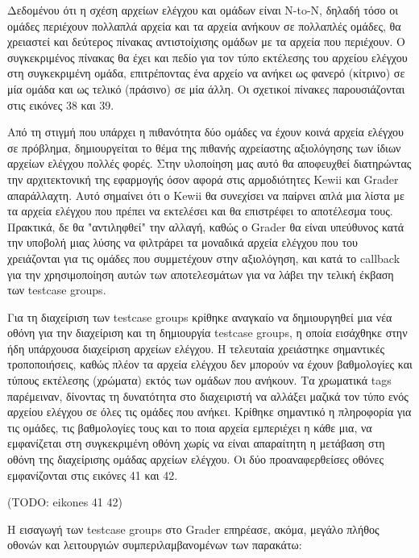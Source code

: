 \documentclass[diploma]{softlab-thesis}
\begin{document}
\bigskip

Δεδομένου ότι η σχέση αρχείων ελέγχου και ομάδων είναι N-to-N, δηλαδή τόσο οι
ομάδες περιέχουν πολλαπλά αρχεία και τα αρχεία ανήκουν σε πολλαπλές ομάδες, θα
χρειαστεί και δεύτερος πίνακας αντιστοίχισης ομάδων με τα αρχεία που περιέχουν.
Ο συγκεκριμένος πίνακας θα έχει και πεδίο για τον τύπο εκτέλεσης του αρχείου
ελέγχου στη συγκεκριμένη ομάδα, επιτρέποντας ένα αρχείο να ανήκει ως φανερό
(κίτρινο) σε μία ομάδα και ως τελικό (πράσινο) σε μία άλλη. Οι σχετικοί πίνακες
παρουσιάζονται στις εικόνες 38 και 39.

\bigskip

Από τη στιγμή που υπάρχει η πιθανότητα δύο ομάδες να έχουν κοινά αρχεία ελέγχου
σε πρόβλημα, δημιουργείται το θέμα της πιθανής αχρείαστης αξιολόγησης των ίδιων
αρχείων ελέγχου πολλές φορές. Στην υλοποίηση μας αυτό θα αποφευχθεί διατηρώντας
την αρχιτεκτονική της εφαρμογής όσον αφορά στις αρμοδιότητες Kewii και Grader
απαράλλαχτη. Αυτό σημαίνει ότι ο Kewii θα συνεχίσει να παίρνει απλά μια λίστα
με τα αρχεία ελέγχου που πρέπει να εκτελέσει και θα επιστρέφει το αποτέλεσμα
τους. Πρακτικά, δε θα "αντιληφθεί" την αλλαγή, καθώς ο Grader θα είναι
υπεύθυνος κατά την υποβολή μιας λύσης να φιλτράρει τα μοναδικά αρχεία ελέγχου
που του χρειάζονται για τις ομάδες που συμμετέχουν στην αξιολόγηση, και κατά το
callback για την χρησιμοποίηση αυτών των αποτελεσμάτων για να λάβει την τελική
έκβαση των testcase groups.

\bigskip

Για τη διαχείριση των testcase groups κρίθηκε αναγκαίο να δημιουργηθεί μια νέα
οθόνη για την διαχείριση και τη δημιουργία testcase groups, η οποία εισάχθηκε
στην ήδη υπάρχουσα διαχείριση αρχείων ελέγχου. Η τελευταία χρειάστηκε
σημαντικές τροποποιήσεις, καθώς πλέον τα αρχεία ελέγχου δεν μπορούν να έχουν
βαθμολογίες και τύπους εκτέλεσης (χρώματα) εκτός των ομάδων που ανήκουν. Τα
χρωματικά tags παρέμειναν, δίνοντας τη δυνατότητα στο διαχειριστή να αλλάξει
μαζικά τον τύπο ενός αρχείου ελέγχου σε όλες τις ομάδες που ανήκει. Κρίθηκε
σημαντικό η πληροφορία για τις ομάδες, τις βαθμολογίες τους και το ποια αρχεία
εμπεριέχει η κάθε μια, να εμφανίζεται στη συγκεκριμένη οθόνη χωρίς να είναι
απαραίτητη η μετάβαση στη οθόνη της διαχείρισης ομάδας αρχείων ελέγχου. Οι δύο
προαναφερθείσες οθόνες εμφανίζονται στις εικόνες 41 και 42.

\bigskip

(TODO: eikones 41 42)

\bigskip

Η εισαγωγή των testcase groups στο Grader επηρέασε, ακόμα, μεγάλο πλήθος οθονών
και λειτουργιών συμπεριλαμβανομένων των παρακάτω:
\end{document}
